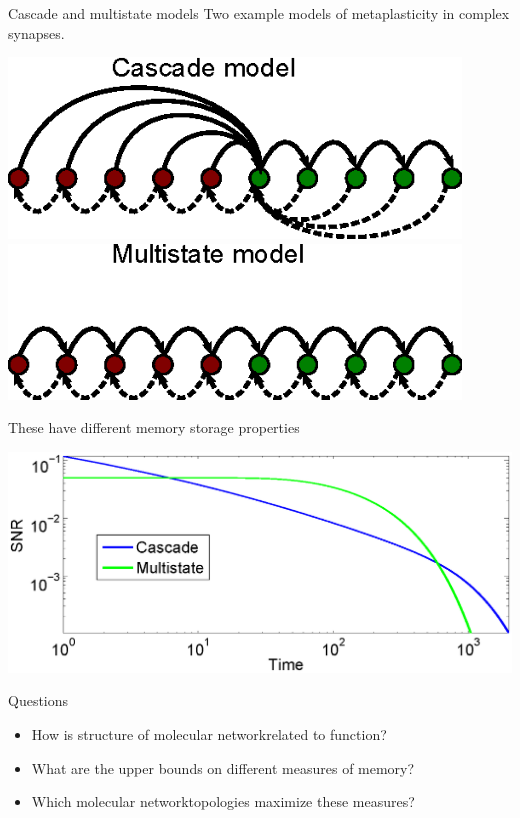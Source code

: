 \documentclass[final,hyperref={pdfpagelabels=false,bookmarks=false}]{beamer}
\newcommand{\citerr}[1]{\hfill {\footnotesize{\color{darkgrey}\cite{#1}}}}
\newcommand{\net}{molecular network}
\begin{document}
\begin{frame}{}
\begin{columns}[t]
\begin{column}{0.32\linewidth}
\begin{block}{Cascade and multistate models}
%
 Two example models of metaplasticity in complex synapses.
 \begin{center}
 \parbox[t]{30cm}{
 \includegraphics[width=12cm]{cascade.eps}
 \hspace{2cm}
 \includegraphics[width=12cm]{multistate.eps}
 }
 \end{center}
 \citerr{Fusi2005cascade,Fusi2007multistate}

 These have different memory storage properties
 \begin{center}
 \includegraphics[width=15cm]{cascms.eps}
 \end{center}
%
\end{block}



\begin{block}{Questions}
%
 \begin{itemize}
   \item How is structure of \net related to function?
   \item What are the upper bounds on different measures of memory?
   \item Which \net topologies maximize these measures?
 \end{itemize}
%
\end{block}



\end{column}
\end{columns}
\end{frame}
\end{document}
